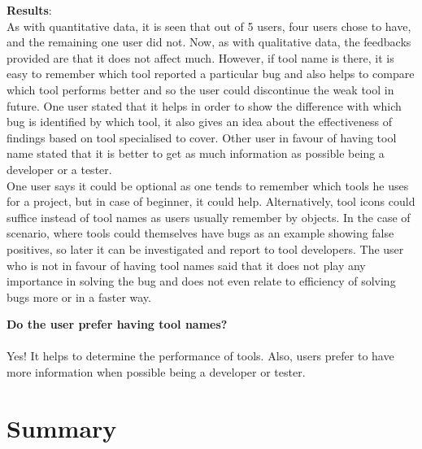 \textbf{Results}: \\

As with quantitative data, it is seen that out of 5 users, four users chose to have, and the remaining one user did not. Now, as with qualitative data, the feedbacks provided are that it does not affect much. However, if tool name is there, it is easy to remember which tool reported a particular bug and also helps to compare which tool performs better and so the user could discontinue the weak tool in future. One user stated that it helps in order to show the difference with which bug is identified by which tool, it also gives an idea about the effectiveness of findings based on tool specialised to cover. Other user in favour of having tool name stated that it is better to get as much information as possible being a developer or a tester. \\

One user says it could be optional as one tends to remember which tools he uses for a project, but in case of beginner, it could help. Alternatively, tool icons could suffice instead of tool names as users usually remember by objects. In the case of scenario, where tools could themselves have bugs as an example showing false positives, so later it can be investigated and report to tool developers. The user who is not in favour of having tool names said that it does not play any importance in solving the bug and does not even relate to efficiency of solving bugs more or in a faster way. \\ 


\begin{myboxi}{{\textbf{Do the user prefer having tool names?}}}
	\\ \\ Yes! It helps to determine the performance of tools. Also, users prefer to have more information when possible being a developer or tester. \\
\end{myboxi}

\clearpage
\section{Summary}

